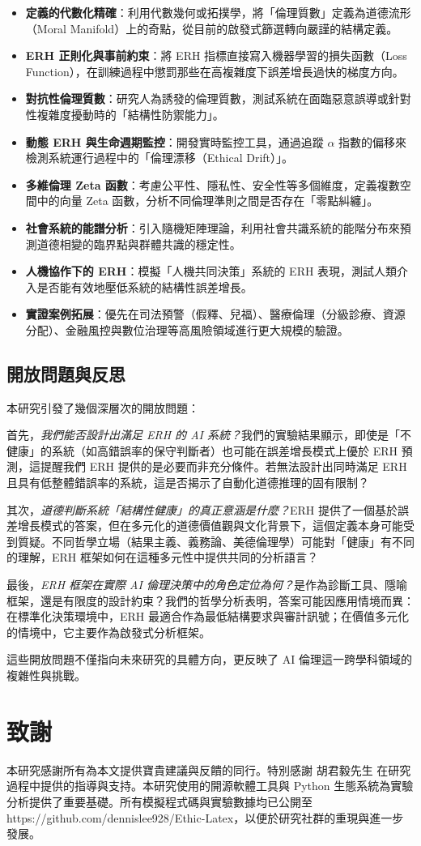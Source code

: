 \documentclass[12pt,a4paper]{article}
\theoremstyle{definition}
\theoremstyle{remark}
\begin{document}
\begin{itemize}
    \item \textbf{定義的代數化精確}：利用代數幾何或拓撲學，將「倫理質數」定義為道德流形（Moral Manifold）上的奇點，從目前的啟發式篩選轉向嚴謹的結構定義。
    \item \textbf{ERH 正則化與事前約束}：將 ERH 指標直接寫入機器學習的損失函數（Loss Function），在訓練過程中懲罰那些在高複雜度下誤差增長過快的梯度方向。
    \item \textbf{對抗性倫理質數}：研究人為誘發的倫理質數，測試系統在面臨惡意誤導或針對性複雜度擾動時的「結構性防禦能力」。
    \item \textbf{動態 ERH 與生命週期監控}：開發實時監控工具，通過追蹤 $\alpha$ 指數的偏移來檢測系統運行過程中的「倫理漂移（Ethical Drift）」。
    \item \textbf{多維倫理 Zeta 函數}：考慮公平性、隱私性、安全性等多個維度，定義複數空間中的向量 Zeta 函數，分析不同倫理準則之間是否存在「零點糾纏」。
    \item \textbf{社會系統的能譜分析}：引入隨機矩陣理論，利用社會共識系統的能階分布來預測道德相變的臨界點與群體共識的穩定性。
    \item \textbf{人機協作下的 ERH}：模擬「人機共同決策」系統的 ERH 表現，測試人類介入是否能有效地壓低系統的結構性誤差增長。
    \item \textbf{實證案例拓展}：優先在司法預警（假釋、兒福）、醫療倫理（分級診療、資源分配）、金融風控與數位治理等高風險領域進行更大規模的驗證。
\end{itemize}

\subsection{開放問題與反思}

本研究引發了幾個深層次的開放問題：

首先，\emph{我們能否設計出滿足 ERH 的 AI 系統？}我們的實驗結果顯示，即使是「不健康」的系統（如高錯誤率的保守判斷者）也可能在誤差增長模式上優於 ERH 預測，這提醒我們 ERH 提供的是必要而非充分條件。若無法設計出同時滿足 ERH 且具有低整體錯誤率的系統，這是否揭示了自動化道德推理的固有限制？

其次，\emph{道德判斷系統「結構性健康」的真正意涵是什麼？}ERH 提供了一個基於誤差增長模式的答案，但在多元化的道德價值觀與文化背景下，這個定義本身可能受到質疑。不同哲學立場（結果主義、義務論、美德倫理學）可能對「健康」有不同的理解，ERH 框架如何在這種多元性中提供共同的分析語言？

最後，\emph{ERH 框架在實際 AI 倫理決策中的角色定位為何？}是作為診斷工具、隱喻框架，還是有限度的設計約束？我們的哲學分析表明，答案可能因應用情境而異：在標準化決策環境中，ERH 最適合作為最低結構要求與審計訊號；在價值多元化的情境中，它主要作為啟發式分析框架。

這些開放問題不僅指向未來研究的具體方向，更反映了 AI 倫理這一跨學科領域的複雜性與挑戰。

\section*{致謝}

本研究感謝所有為本文提供寶貴建議與反饋的同行。特別感謝 胡君毅先生 在研究過程中提供的指導與支持。本研究使用的開源軟體工具與 Python 生態系統為實驗分析提供了重要基礎。所有模擬程式碼與實驗數據均已公開至https://github.com/dennislee928/Ethic-Latex，以便於研究社群的重現與進一步發展。



\end{document}

